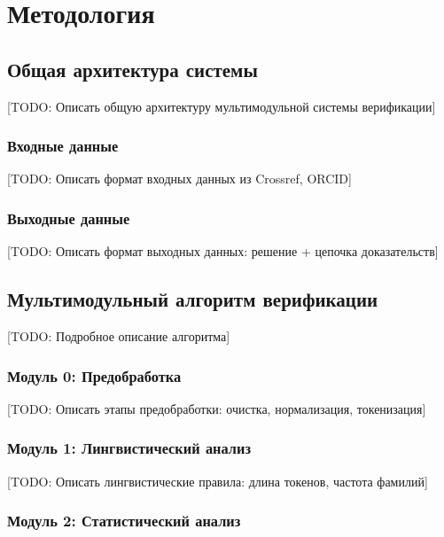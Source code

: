 
\chapter{Методология}
\label{ch:methodology}

\section{Общая архитектура системы}
\label{sec:method:architecture}

[TODO: Описать общую архитектуру мультимодульной системы верификации]

\subsection{Входные данные}
\label{subsec:method:input}

[TODO: Описать формат входных данных из Crossref, ORCID]

\subsection{Выходные данные}
\label{subsec:method:output}

[TODO: Описать формат выходных данных: решение + цепочка доказательств]

\section{Мультимодульный алгоритм верификации}
\label{sec:method:algorithm}

[TODO: Подробное описание алгоритма]

\subsection{Модуль 0: Предобработка}
\label{subsec:method:preprocessing}

[TODO: Описать этапы предобработки: очистка, нормализация, токенизация]

\subsection{Модуль 1: Лингвистический анализ}
\label{subsec:method:linguistic}

[TODO: Описать лингвистические правила: длина токенов, частота фамилий]

\subsection{Модуль 2: Статистический анализ}
\label{subsec:method:statistical}

